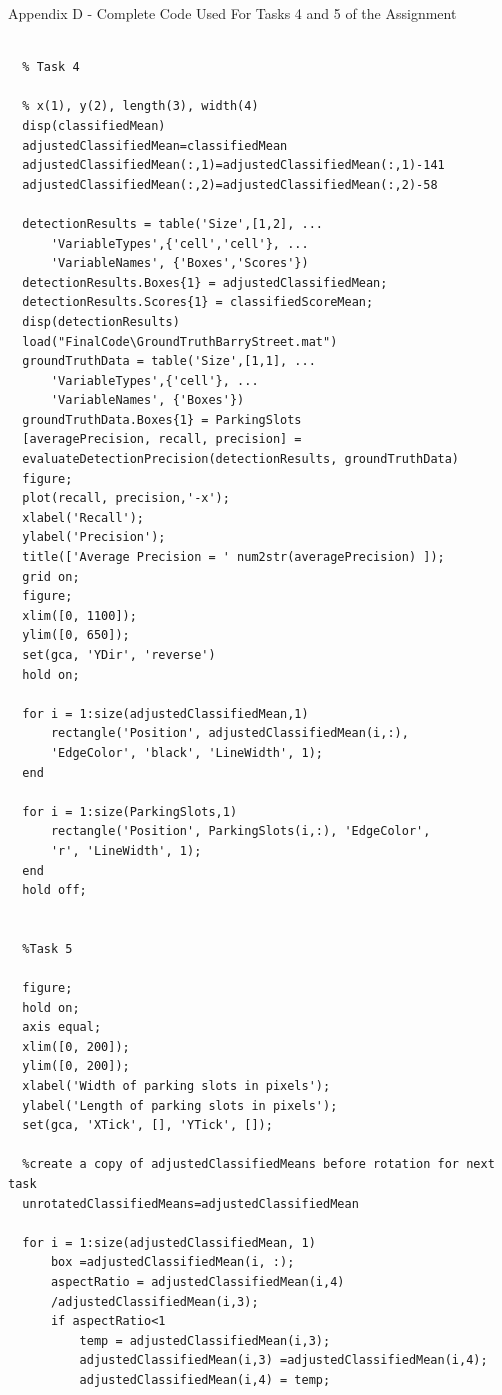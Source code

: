 \documentclass[man]{apa7}
\begin{document}
\newpage

\noindent Appendix D - Complete Code Used For Tasks 4 and 5 of the Assignment
\begin{lstlisting}[]

  % Task 4

  % x(1), y(2), length(3), width(4)
  disp(classifiedMean)
  adjustedClassifiedMean=classifiedMean
  adjustedClassifiedMean(:,1)=adjustedClassifiedMean(:,1)-141
  adjustedClassifiedMean(:,2)=adjustedClassifiedMean(:,2)-58
  
  detectionResults = table('Size',[1,2], ...
      'VariableTypes',{'cell','cell'}, ...
      'VariableNames', {'Boxes','Scores'})
  detectionResults.Boxes{1} = adjustedClassifiedMean;
  detectionResults.Scores{1} = classifiedScoreMean;
  disp(detectionResults)
  load("FinalCode\GroundTruthBarryStreet.mat")
  groundTruthData = table('Size',[1,1], ...
      'VariableTypes',{'cell'}, ...
      'VariableNames', {'Boxes'})
  groundTruthData.Boxes{1} = ParkingSlots
  [averagePrecision, recall, precision] = 
  evaluateDetectionPrecision(detectionResults, groundTruthData)
  figure;
  plot(recall, precision,'-x');
  xlabel('Recall');
  ylabel('Precision');
  title(['Average Precision = ' num2str(averagePrecision) ]);
  grid on;
  figure;
  xlim([0, 1100]);
  ylim([0, 650]);
  set(gca, 'YDir', 'reverse')
  hold on;
  
  for i = 1:size(adjustedClassifiedMean,1)
      rectangle('Position', adjustedClassifiedMean(i,:), 
      'EdgeColor', 'black', 'LineWidth', 1);
  end
  
  for i = 1:size(ParkingSlots,1)
      rectangle('Position', ParkingSlots(i,:), 'EdgeColor', 
      'r', 'LineWidth', 1);
  end
  hold off;
  
  
  %Task 5
  
  figure;
  hold on;
  axis equal;
  xlim([0, 200]);
  ylim([0, 200]);
  xlabel('Width of parking slots in pixels');
  ylabel('Length of parking slots in pixels');
  set(gca, 'XTick', [], 'YTick', []);
  
  %create a copy of adjustedClassifiedMeans before rotation for next task
  unrotatedClassifiedMeans=adjustedClassifiedMean
  
  for i = 1:size(adjustedClassifiedMean, 1)
      box =adjustedClassifiedMean(i, :);
      aspectRatio = adjustedClassifiedMean(i,4) 
      /adjustedClassifiedMean(i,3);
      if aspectRatio<1
          temp = adjustedClassifiedMean(i,3);
          adjustedClassifiedMean(i,3) =adjustedClassifiedMean(i,4);
          adjustedClassifiedMean(i,4) = temp;
          

\end{lstlisting}
\end{document}
